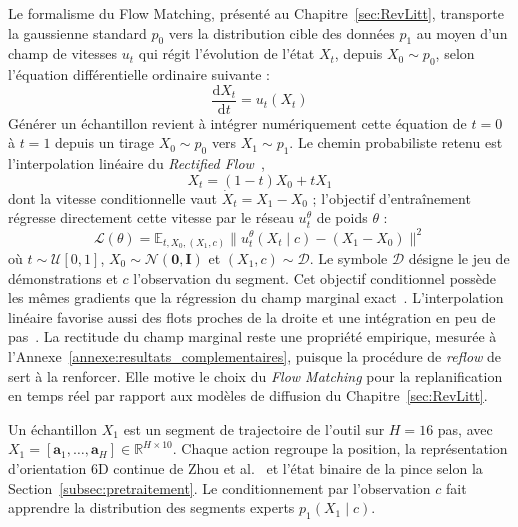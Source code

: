 Le formalisme du Flow Matching, présenté au Chapitre~\ref{sec:RevLitt}, transporte la gaussienne standard $p_0$ vers la distribution cible des données $p_1$ au moyen d'un champ de vitesses $u_t$ qui régit l'évolution de l'état $X_t$, depuis $X_0\sim p_0$, selon l'équation différentielle ordinaire suivante :
\begin{equation}
  \label{eq:ode}
  \frac{\mathrm{d}X_t}{\mathrm{d} t} = u_t(X_t)
\end{equation}
Générer un échantillon revient à intégrer numériquement cette équation de $t=0$ à $t=1$ depuis un tirage $X_0\sim p_0$ vers $X_1\sim p_1$. Le chemin probabiliste retenu est l'interpolation linéaire du \textit{Rectified Flow}~\cite{Liu2023Rectified},
\begin{equation}
  \label{eq:fm_gt}
  X_t = (1-t)X_0 + tX_1
\end{equation}
dont la vitesse conditionnelle vaut $\dot{X}_t = X_1-X_0$ ; l'objectif d'entraînement régresse directement cette vitesse par le réseau $u_t^{\theta}$ de poids $\theta$ :
\begin{equation}
  \label{eq:Loss}
  \mathcal{L}(\theta) = \mathbb{E}_{t,X_0,(X_1,c)}\bigl\lVert u_t^{\theta}(X_t \mid c)-(X_1-X_0)\bigr\rVert^2
\end{equation}
où $t\sim\mathcal{U}[0,1]$, $X_0\sim\mathcal{N}(\mathbf{0},\mathbf{I})$ et $(X_1,c)\sim\mathcal{D}$. Le symbole $\mathcal{D}$ désigne le jeu de démonstrations et $c$ l'observation du segment. Cet objectif conditionnel possède les mêmes gradients que la régression du champ marginal exact~\cite{Lipman2023Flow}. L'interpolation linéaire favorise aussi des flots proches de la droite et une intégration en peu de pas~\cite{lipman2024flowmatchingguidecode}. La rectitude du champ marginal reste une propriété empirique, mesurée à l'Annexe~\ref{annexe:resultats_complementaires}, puisque la procédure de \textit{reflow} de~\cite{Liu2023Rectified} sert à la renforcer. Elle motive le choix du \textit{Flow Matching} pour la replanification en temps réel par rapport aux modèles de diffusion du Chapitre~\ref{sec:RevLitt}.

Un échantillon $X_1$ est un segment de trajectoire de l'outil sur $H=16$ pas, avec $X_1=[\mathbf{a}_1,\dots,\mathbf{a}_H]\in\mathbb{R}^{H\times10}$. Chaque action regroupe la position, la représentation d'orientation 6D continue de Zhou et al.~\cite{Zhou2020Continuity} et l'état binaire de la pince selon la Section~\ref{subsec:pretraitement}. Le conditionnement par l'observation $c$ fait apprendre la distribution des segments experts $p_1(X_1\mid c)$.

